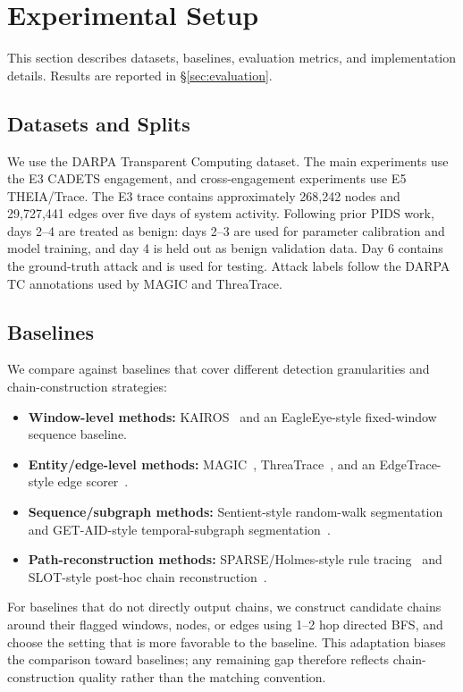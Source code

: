 \section{Experimental Setup}
\label{sec:setup}

This section describes datasets, baselines, evaluation metrics, and implementation details. Results are reported in \S\ref{sec:evaluation}.

\subsection{Datasets and Splits}

We use the DARPA Transparent Computing dataset. The main experiments use the E3 CADETS engagement, and cross-engagement experiments use E5 THEIA/Trace. The E3 trace contains approximately 268{,}242 nodes and 29{,}727{,}441 edges over five days of system activity. Following prior PIDS work, days 2--4 are treated as benign: days 2--3 are used for parameter calibration and model training, and day 4 is held out as benign validation data. Day 6 contains the ground-truth attack and is used for testing. Attack labels follow the DARPA TC annotations used by MAGIC and ThreaTrace.

\subsection{Baselines}

We compare against baselines that cover different detection granularities and chain-construction strategies:
\begin{itemize}
\item \textbf{Window-level methods:} KAIROS~\cite{cheng2024kairos} and an EagleEye-style fixed-window sequence baseline.
\item \textbf{Entity/edge-level methods:} MAGIC~\cite{jia2024magic}, ThreaTrace~\cite{wang2022threatrace}, and an EdgeTrace-style edge scorer~\cite{edgetrace2025}.
\item \textbf{Sequence/subgraph methods:} Sentient-style random-walk segmentation~\cite{sentient2026} and GET-AID-style temporal-subgraph segmentation~\cite{getaid2025}.
\item \textbf{Path-reconstruction methods:} SPARSE/Holmes-style rule tracing~\cite{sparse2024,holmes2019} and SLOT-style post-hoc chain reconstruction~\cite{slot2025}.
\end{itemize}

For baselines that do not directly output chains, we construct candidate chains around their flagged windows, nodes, or edges using 1--2 hop directed BFS, and choose the setting that is more favorable to the baseline. This adaptation biases the comparison toward baselines; any remaining gap therefore reflects chain-construction quality rather than the matching convention.

